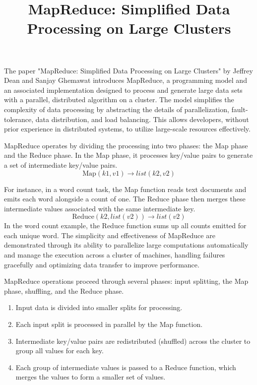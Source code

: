 \documentclass{article}
\title{MapReduce: Simplified Data Processing on Large Clusters}
\date{}
\begin{document}
\maketitle
The paper "MapReduce: Simplified Data Processing on Large Clusters" by Jeffrey Dean and Sanjay Ghemawat introduces MapReduce, a programming model and an associated implementation designed to process and generate large data sets with a parallel, distributed algorithm on a cluster. The model simplifies the complexity of data processing by abstracting the details of parallelization, fault-tolerance, data distribution, and load balancing. This allows developers, without prior experience in distributed systems, to utilize large-scale resources effectively.

MapReduce operates by dividing the processing into two phases: the Map phase and the Reduce phase. In the Map phase, it processes key/value pairs to generate a set of intermediate key/value pairs. 
\begin{equation}
    \text{Map}(k1, v1) \rightarrow list(k2, v2)
\end{equation}

For instance, in a word count task, the Map function reads text documents and emits each word alongside a count of one. The Reduce phase then merges these intermediate values associated with the same intermediate key. 
\begin{equation}
    \text{Reduce}(k2, list(v2)) \rightarrow list(v2)
\end{equation} In the word count example, the Reduce function sums up all counts emitted for each unique word. The simplicity and effectiveness of MapReduce are demonstrated through its ability to parallelize large computations automatically and manage the execution across a cluster of machines, handling failures gracefully and optimizing data transfer to improve performance.

MapReduce operations proceed through several phases: input splitting, the Map phase, shuffling, and the Reduce phase.

\begin{enumerate}
    \item Input data is divided into smaller splits for processing.
    \item Each input split is processed in parallel by the Map function.
    \item Intermediate key/value pairs are redistributed (shuffled) across the cluster to group all values for each key.
    \item Each group of intermediate values is passed to a Reduce function, which merges the values to form a smaller set of values.
\end{enumerate}
\end{document}
